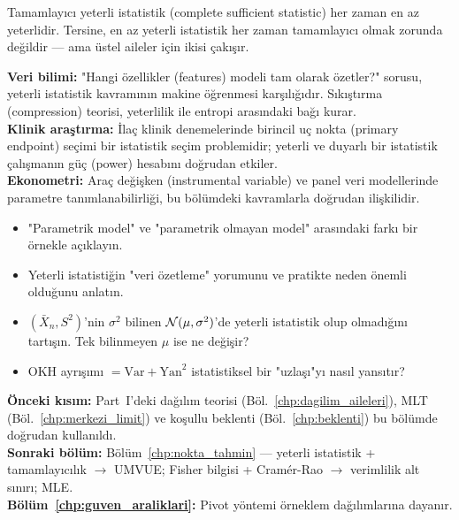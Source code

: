 \begin{hocanotu}
Tamamlayıcı yeterli istatistik (complete sufficient statistic) her zaman en az yeterlidir.
Tersine, en az yeterli istatistik her zaman tamamlayıcı olmak zorunda değildir ---
ama üstel aileler için ikisi çakışır.
\end{hocanotu}

\begin{kopru}
\textbf{Veri bilimi:} "Hangi özellikler (features) modeli tam olarak özetler?" sorusu,
yeterli istatistik kavramının makine öğrenmesi karşılığıdır.
Sıkıştırma (compression) teorisi, yeterlilik ile entropi arasındaki bağı kurar.\\
\textbf{Klinik araştırma:} İlaç klinik denemelerinde birincil uç nokta (primary endpoint)
seçimi bir istatistik seçim problemidir; yeterli ve duyarlı bir istatistik
çalışmanın güç (power) hesabını doğrudan etkiler.\\
\textbf{Ekonometri:} Araç değişken (instrumental variable) ve panel veri modellerinde
parametre tanımlanabilirliği, bu bölümdeki kavramlarla doğrudan ilişkilidir.
\end{kopru}

\begin{ozyansima}
\begin{itemize}
  \item "Parametrik model" ve "parametrik olmayan model" arasındaki farkı bir örnekle açıklayın.
  \item Yeterli istatistiğin "veri özetleme" yorumunu ve pratikte neden önemli olduğunu anlatın.
  \item $(\bar{X}_n, S^2)$'nin $\sigma^2$ bilinen $\mathcal{N}(\mu,\sigma^2)$'de yeterli istatistik olup
        olmadığını tartışın. Tek bilinmeyen $\mu$ ise ne değişir?
  \item OKH ayrışımı $= \mathrm{Var} + \mathrm{Yan}^2$ istatistiksel bir "uzlaşı"yı nasıl yansıtır?
\end{itemize}
\end{ozyansima}

\begin{kopru}
\textbf{Önceki kısım:} Part~I'deki dağılım teorisi (Böl.~\ref{chp:dagilim_aileleri}),
MLT (Böl.~\ref{chp:merkezi_limit}) ve koşullu beklenti (Böl.~\ref{chp:beklenti})
bu bölümde doğrudan kullanıldı.\\
\textbf{Sonraki bölüm:} Bölüm~\ref{chp:nokta_tahmin} --- yeterli istatistik + tamamlayıcılık
$\to$ UMVUE; Fisher bilgisi + Cramér-Rao $\to$ verimlilik alt sınırı; MLE.\\
\textbf{Bölüm~\ref{chp:guven_araliklari}:} Pivot yöntemi örneklem dağılımlarına dayanır.
\end{kopru}

